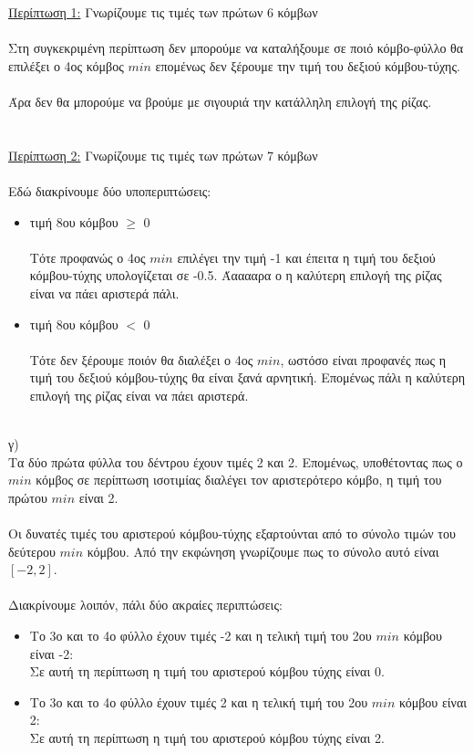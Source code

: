 \documentclass[12pt]{article}
\begin{document}
\underline{Περίπτωση 1:} Γνωρίζουμε τις τιμές των πρώτων 6 κόμβων\\\\
Στη συγκεκριμένη περίπτωση δεν μπορούμε να καταλήξουμε σε ποιό κόμβο-φύλλο θα επιλέξει ο 4ος κόμβος $min$ επομένως δεν ξέρουμε την τιμή του δεξιού κόμβου-τύχης.\\\\
Άρα δεν θα μπορούμε να βρούμε με σιγουριά την κατάλληλη επιλογή της ρίζας.\\\\\\
\underline{Περίπτωση 2:} Γνωρίζουμε τις τιμές των πρώτων 7 κόμβων\\\\
Εδώ διακρίνουμε δύο υποπεριπτώσεις:
\begin{itemize}
    \item τιμή 8ου κόμβου $\geq$ 0\\\\
    Τότε προφανώς ο 4ος $min$ επιλέγει την τιμή -1 και έπειτα η τιμή του δεξιού κόμβου-τύχης υπολογίζεται σε -0.5. Άααααρα ο η καλύτερη επιλογή της ρίζας είναι να πάει αριστερά πάλι.\\
    \item τιμή 8ου κόμβου $<$ 0 \\\\
    Τότε δεν ξέρουμε ποιόν θα διαλέξει ο 4ος $min$, ωστόσο είναι προφανές πως η τιμή του δεξιού κόμβου-τύχης θα είναι ξανά αρνητική. Επομένως πάλι η καλύτερη επιλογή της ρίζας είναι να πάει αριστερά.\\\\   
\end{itemize}
γ)\\
Τα δύο πρώτα φύλλα του δέντρου έχουν τιμές 2 και 2. Επομένως, υποθέτοντας πως ο $min$ κόμβος σε περίπτωση ισοτιμίας διαλέγει τον αριστερότερο κόμβο, η τιμή του πρώτου $min$ είναι 2.\\\\
Οι δυνατές τιμές του αριστερού κόμβου-τύχης εξαρτούνται από το σύνολο τιμών του δεύτερου $min$ κόμβου. Από την εκφώνηση γνωρίζουμε πως το σύνολο αυτό είναι $[-2,2]$.\\\\
Διακρίνουμε λοιπόν, πάλι δύο ακραίες περιπτώσεις:\\
\begin{itemize}
    \item Το 3ο και το 4ο φύλλο έχουν τιμές -2 και η τελική τιμή του 2ου $min$ κόμβου είναι -2:\\
    Σε αυτή τη περίπτωση η τιμή του αριστερού κόμβου τύχης είναι 0.
    \item Το 3ο και το 4ο φύλλο έχουν τιμές 2 και η τελική τιμή του 2ου $min$ κόμβου είναι 2:\\
    Σε αυτή τη περίπτωση η τιμή του αριστερού κόμβου τύχης είναι 2.
\end{itemize}
\end{document}

